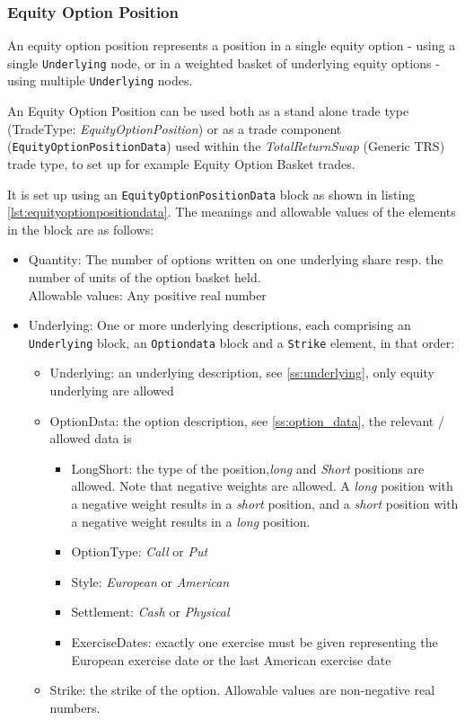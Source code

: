 \subsubsection{Equity Option Position}
\label{ss:equity_option_position}

An equity option position represents a position in a single equity option - using a single \lstinline!Underlying! node,
or in a weighted basket of underlying equity options - using multiple \lstinline!Underlying! nodes.

An Equity Option Position can be used both as a stand alone trade type (TradeType: \emph{EquityOptionPosition}) or as a
trade component ({\tt EquityOptionPositionData}) used within the \emph{TotalReturnSwap} (Generic TRS) trade type, to set
up for example Equity Option Basket trades.

It is set up using an {\tt EquityOptionPositionData} block as shown in listing \ref{lst:equityoptionpositiondata}. The
meanings and allowable values of the elements in the block are as follows:

\begin{itemize}
\item Quantity: The number of options written on one underlying share resp. the number of units of the option basket
  held. \\
  Allowable values: Any positive real number
\item Underlying: One or more underlying descriptions, each comprising an \lstinline!Underlying! block, an \lstinline!Optiondata! block and a \lstinline!Strike! element, in that order:
  \begin{itemize}
  \item Underlying: an underlying description, see \ref{ss:underlying}, only equity underlying are allowed
  \item OptionData: the option description, see \ref{ss:option_data}, the relevant / allowed data is
    \begin{itemize}
    \item LongShort: the type of the position,\emph{long} and \emph{Short} positions are allowed. Note that negative weights are allowed. A \emph{long} position with a negative weight results in a \emph{short} position, and a \emph{short} position with a negative weight results in a \emph{long} position.
    \item OptionType: \emph{Call} or \emph{Put}
    \item Style: \emph{European} or \emph{American}
    \item Settlement: \emph{Cash} or \emph{Physical}
    \item ExerciseDates: exactly one exercise must be given representing the European exercise date or the last American
      exercise date
    \end{itemize}
  \item Strike: the strike of the option. Allowable values are non-negative real numbers.
  \end{itemize}
\end{itemize}

